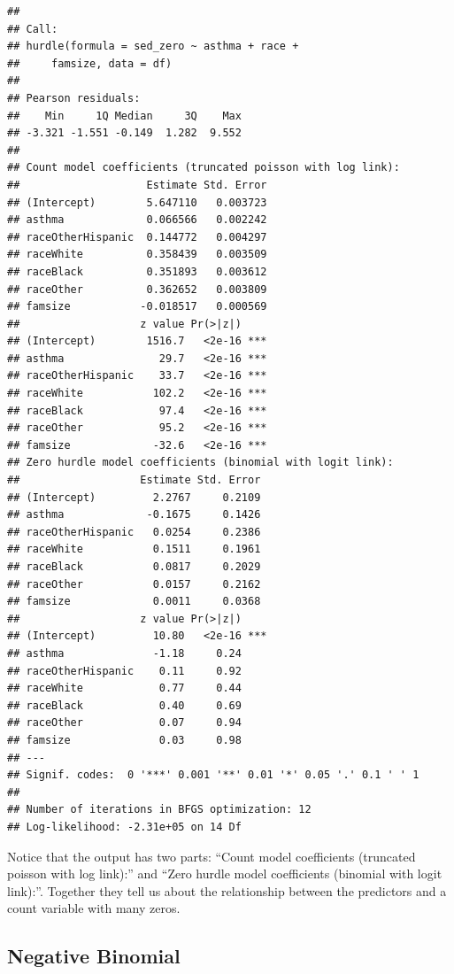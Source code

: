 \documentclass[]{tufte-book}
\theoremstyle{definition}
\theoremstyle{definition}
\theoremstyle{remark}
\begin{document}
\begin{verbatim}
## 
## Call:
## hurdle(formula = sed_zero ~ asthma + race + 
##     famsize, data = df)
## 
## Pearson residuals:
##    Min     1Q Median     3Q    Max 
## -3.321 -1.551 -0.149  1.282  9.552 
## 
## Count model coefficients (truncated poisson with log link):
##                    Estimate Std. Error
## (Intercept)        5.647110   0.003723
## asthma             0.066566   0.002242
## raceOtherHispanic  0.144772   0.004297
## raceWhite          0.358439   0.003509
## raceBlack          0.351893   0.003612
## raceOther          0.362652   0.003809
## famsize           -0.018517   0.000569
##                   z value Pr(>|z|)    
## (Intercept)        1516.7   <2e-16 ***
## asthma               29.7   <2e-16 ***
## raceOtherHispanic    33.7   <2e-16 ***
## raceWhite           102.2   <2e-16 ***
## raceBlack            97.4   <2e-16 ***
## raceOther            95.2   <2e-16 ***
## famsize             -32.6   <2e-16 ***
## Zero hurdle model coefficients (binomial with logit link):
##                   Estimate Std. Error
## (Intercept)         2.2767     0.2109
## asthma             -0.1675     0.1426
## raceOtherHispanic   0.0254     0.2386
## raceWhite           0.1511     0.1961
## raceBlack           0.0817     0.2029
## raceOther           0.0157     0.2162
## famsize             0.0011     0.0368
##                   z value Pr(>|z|)    
## (Intercept)         10.80   <2e-16 ***
## asthma              -1.18     0.24    
## raceOtherHispanic    0.11     0.92    
## raceWhite            0.77     0.44    
## raceBlack            0.40     0.69    
## raceOther            0.07     0.94    
## famsize              0.03     0.98    
## ---
## Signif. codes:  0 '***' 0.001 '**' 0.01 '*' 0.05 '.' 0.1 ' ' 1 
## 
## Number of iterations in BFGS optimization: 12 
## Log-likelihood: -2.31e+05 on 14 Df
\end{verbatim}

Notice that the output has two parts: ``Count model coefficients
(truncated poisson with log link):'' and ``Zero hurdle model
coefficients (binomial with logit link):''. Together they tell us about
the relationship between the predictors and a count variable with many
zeros.

\subsection*{Negative Binomial}\label{negative-binomial}
\end{document}
